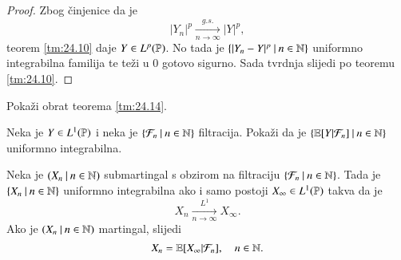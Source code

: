 \begin{proof}
    Zbog \v cinjenice da je
    \begin{equation*}
        |Y_n|^p \xrightarrow[n \to \infty]{g.s.} |Y|^p,
    \end{equation*}
    teorem \ref{tm:24.10} daje $Y \in L^p (\mathbb{P})$.
    No tada je $\{{|Y_n - Y|^p} \: | \: {n \in \mathbb{N}}\}$ uniformno integrabilna familija te te\v zi u $0$ gotovo sigurno.
    Sada tvrdnja slijedi po teoremu \ref{tm:24.10}.
\end{proof}

\begin{zad} \label{zad:24.15}
    Poka\v zi obrat teorema \ref{tm:24.14}.
\end{zad}

\begin{zad} \label{zad:24.16}
    Neka je $Y \in L^1 (\mathbb{P})$ i neka je $\{{\mathcal{F}_n} \: | \: {n \in \mathbb{N}}\}$ filtracija.
    Poka\v zi da je $\{{\mathbb{E} [Y | \mathcal{F}_n]} \: | \: {n \in \mathbb{N}}\}$ uniformno integrabilna.
\end{zad}

\begin{tm}  \label{tm:24.17}
    Neka je $({X_n} \: | \: {n \in \mathbb{N}})$ submartingal s obzirom na filtraciju $\{{\mathcal{F}_n} \: | \: {n \in \mathbb{N}}\}$.
    Tada je $\{{X_n} \: | \: {n \in \mathbb{N}}\}$ uniformno integrabilna ako i samo postoji $X_\infty \in L^1 (\mathbb{P})$ takva da je
    \begin{equation*}
        X_n \xrightarrow[n \to \infty]{L^1} X_\infty.
    \end{equation*}
    Ako je $({X_n} \: | \: {n \in \mathbb{N}})$ martingal, slijedi
    \begin{equation*}
        X_n = \mathbb{E} [X_\infty | \mathcal{F}_n], \quad n \in \mathbb{N}.
    \end{equation*}
\end{tm}

